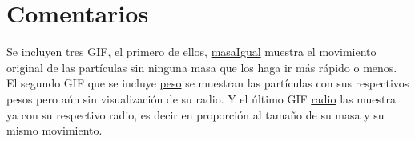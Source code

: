 \documentclass[a4paper]{article}
\begin{document}
\section{Comentarios}
Se incluyen tres GIF, el primero de ellos, \href{https://github.com/ValeryGomez/SimulacionSistemas/blob/master/P9/MasaIgual.gif}{masaIgual} muestra el movimiento original de las partículas sin ninguna masa que los haga ir más rápido o menos. El segundo GIF que se incluye \href{https://github.com/ValeryGomez/SimulacionSistemas/blob/master/P9/Peso.gif}{peso} se muestran las partículas con sus respectivos pesos pero aún sin visualización de su radio. Y el último GIF \href{https://github.com/ValeryGomez/SimulacionSistemas/blob/master/P9/Radios.gif}{radio} las muestra ya con su respectivo radio, es decir en proporción al tamaño de su masa y su mismo movimiento.
\end{document}

